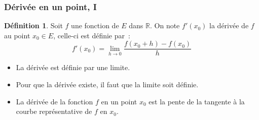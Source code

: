 \documentclass[10pt,notheorems]{beamer}
\theoremstyle{plain}
\theoremstyle{definition} %
\newtheorem{definition}{Définition}
\begin{document}
\begin{frame}
  \frametitle{Dérivée en un point, I}
  \hypertarget{slide_derivee_1}{}

  \begin{definition}
    Soit $f$ une fonction de $E$ dans $\mathbb R$. On note $f'(x_0)$ la dérivée de $f$ au point $x_0\in E$, celle-ci est définie par~:
    \[
      f'(x_0) = \lim_{h\rightarrow 0} \frac{f(x_0+h)-f(x_0)}{h}
    \]
  \end{definition}

  \bigskip

  \begin{itemize}

  \item La dérivée est définie par une limite.\newline

  \item Pour que la dérivée existe, il faut que la limite soit définie.\newline

  \item La dérivée de la fonction $f$ en un point $x_0$ est la pente de la tangente à la courbe représentative de $f$ en $x_0$.
  \end{itemize}

\end{frame}
\end{document}
